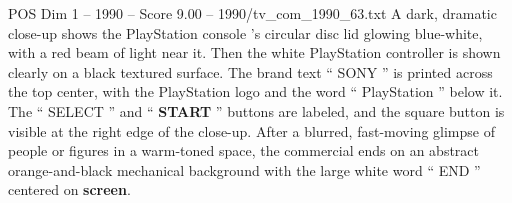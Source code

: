 \begin{textsample}{POS Dim 1 – 1990 – Score 9.00 – 1990/tv\_com\_1990\_63.txt}
A dark, dramatic close-up shows the PlayStation console ’s circular disc lid glowing blue-white, with a red beam of light near it.
Then the white PlayStation controller is shown clearly on a black textured surface.
The brand text “ SONY ” is printed across the top center, with the PlayStation logo and the word “ PlayStation ” below it.
The “ SELECT ” and “ \textbf{START} ” buttons are labeled, and the square button is visible at the right edge of the close-up.
After a blurred, fast-moving glimpse of people or figures in a warm-toned space, the commercial ends on an abstract orange-and-black mechanical background with the large white word “ END ” centered on \textbf{screen}.

\end{textsample}

